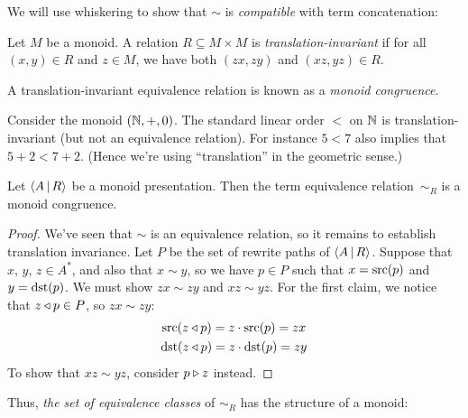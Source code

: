 \documentclass[../generics]{subfiles}
\begin{document}
We will use whiskering to show that $\sim$ is \emph{compatible} with term concatenation:
\begin{definition}\label{translation invariant def}
Let $M$ be a monoid. A relation $R\subseteq M\times M$ is \emph{translation-invariant} if for all $(x,y)\in R$ and $z\in M$, we have both $(zx,zy)$ and $(xz,yz)\in R$.
\end{definition}
A translation-invariant equivalence relation is known as a \emph{monoid congruence}.
\begin{example}
Consider the monoid $(\mathbb{N},+,0)$. The standard linear order $<$ on $\mathbb{N}$ is translation-invariant (but not an equivalence relation). For instance $5<7$ also implies that $5+2<7+2$. (Hence we're using ``translation'' in the geometric sense.)
\end{example}
\begin{theorem}
Let $\langle A\,|\,R\rangle$ be a monoid presentation. Then the term equivalence relation~$\sim_R$ is a monoid congruence.
\end{theorem}
\begin{proof}
We've seen that $\sim$ is an equivalence relation, so it remains to establish translation invariance. Let $P$ be the set of rewrite paths of $\langle A\,|\,R\rangle$. Suppose that $x$, $y$, $z\in A^*$, and also that $x\sim y$, so we have $p\in P$ such that $x=\operatorname{src}(p)$ and $y=\operatorname{dst}(p)$. We must show $zx\sim zy$ and $xz\sim yz$. For the first claim, we notice that $z\triangleleft p\in P$, so $zx\sim zy$:
\begin{gather*}
\operatorname{src}(z\triangleleft p)=z\cdot \operatorname{src}(p)=zx\\
\operatorname{dst}(z\triangleleft p)=z\cdot \operatorname{dst}(p)=zy
\end{gather*}
To show that $xz \sim yz$, consider $p\triangleright z$ instead.
\end{proof}

Thus, \emph{the set of equivalence classes} of $\sim_R$ has the structure of a monoid:
\end{document}
